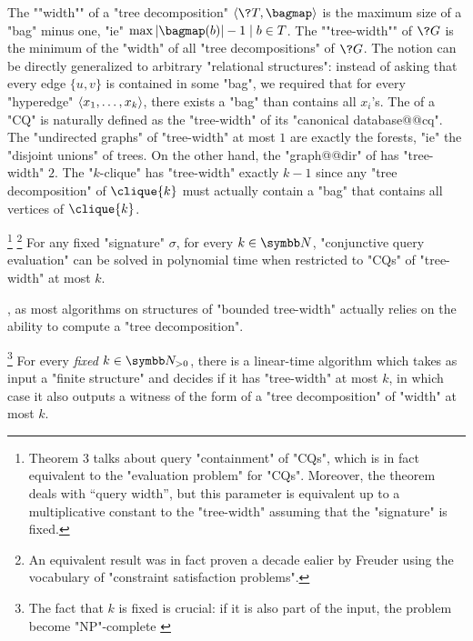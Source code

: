 The \AP""width"" of a "tree decomposition" $\tup{\?T, \bagmap}$ is the maximum size of a "bag" minus one, "ie" $\max{|\bagmap(b)|-1 \mid b\in T}$.
The \AP""tree-width"" of $\?G$ is the minimum of the "width" of all "tree decompositions" of $\?G$. 
The notion can be directly generalized to arbitrary "relational structures":
instead of asking that every edge $\{u,v\}$ is contained in some "bag",
we required that for every "hyperedge" $\langle x_1,\dotsc,x_k\rangle$,
there exists a "bag" than contains all $x_i$'s.
The  of a "CQ" is naturally defined as
the "tree-width" of its "canonical database@@cq".
The "undirected graphs" of "tree-width" at most $1$ are exactly
the forests, "ie" the "disjoint unions" of trees.
On the other hand, the "graph@@dir" of  has "tree-width" $2$.
The "$k$-clique" has "tree-width" exactly $k-1$ since any "tree decomposition"
of $\clique{k}$ must actually contain a "bag" that contains all vertices of $\clique{k}$.

\begin{proposition}
	\!\footnote{Theorem 3 talks about query "containment" of "CQs", which is in fact equivalent
	to the "evaluation problem" for "CQs". Moreover, the theorem deals with ``query width'',
	but this parameter is equivalent up to a multiplicative constant to the "tree-width"
	\cite[Lemma~2]{ChekuriRajaraman2000Containment} assuming that the "signature" is fixed.} 
	\footnote{An equivalent result was in fact proven a decade ealier
	by Freuder \cite[Theorem~3]{Freuder1990Complexity} using the
	vocabulary of "constraint satisfaction problems".}
	\AP\label{prop:eval-CQ-bounded-tw}
	For any fixed "signature" $\sigma$,
	for every $k\in\N$, "conjunctive query evaluation" can
	be solved in polynomial time when restricted to "CQs" of
	"tree-width" at most $k$.
\end{proposition}

, as most algorithms on structures of
"bounded tree-width" actually relies on the ability to compute
a "tree decomposition".
\begin{proposition}
	\!\footnote{The fact that $k$ is fixed is crucial: if it is also
	part of the input, the problem become "NP"-complete
	\cite[Theorem~3.3]{ArnborgCorneilProskurowski1987Complexity}}
	\label{prop:bodlaender}
	For every \emph{fixed} $k\in\Np$, there is a linear-time algorithm
	which takes as input a "finite structure" and decides
	if it has "tree-width" at most $k$, in which case it also
	outputs a witness of the form of a "tree decomposition" of "width" at most $k$. 
\end{proposition}

